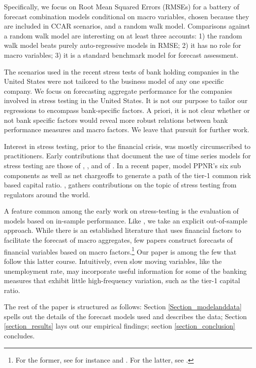 \documentclass[12pt]{article}
\begin{document}
Specifically, we focus on Root Mean Squared Errors (RMSEs) for a
battery of forecast combination models conditional on macro
variables, chosen because they are included in CCAR scenarios, and
a random walk model. Comparisons against a random walk model are
interesting on at least three accounts: 1) the random walk model
beats purely auto-regressive models in RMSE; 2) it has no role for
macro variables; 3) it is a standard benchmark model for forecast
assessment.

The scenarios used in the recent stress tests of bank holding
companies in the United States were not tailored to the business
model of any one specific company. We focus on forecasting
aggregate performance for the companies involved in stress testing
in the United States. It is not our purpose to tailor our
regressions to encompass bank-specific factors. A priori, it is
not clear whether or not bank specific factors would reveal more
robust relations between bank performance measures and macro
factors. We leave that pursuit for further work.

Interest in stress testing, prior to the financial crisis, was
mostly circumscribed to practitioners. Early contributions that
document the use of time series models for stress testing are
those of , , and of
. In a recent paper,  model
PPNR's six sub components as well as net chargeoffs to generate a
path of the tier-1 common risk based capital ratio.
, gathers contributions on the topic of
stress testing from regulators around the world.

A feature common among the early work on stress-testing is the
evaluation of models based on in-sample performance. Like
, we take an explicit out-of-sample approach.
While there is an established literature that uses financial
factors to facilitate the forecast of macro aggregates, few papers
construct forecasts of financial variables based on macro
factors.\footnote{For the former, see for instance
 and . For the latter, see
.} Our paper is among the few that follow this
latter course. Intuitively, even slow moving variables, like the
unemployment rate, may incorporate useful information for some of
the banking measures that exhibit little high-frequency variation,
such as the tier-1 capital ratio.

The rest of the paper is structured as follows: Section
\ref{Section_modelanddata} spells out the details of the forecast
models used and describes the data; Section \ref{section_results}
lays out our empirical findings; section \ref{section_conclusion}
concludes.
\end{document}
